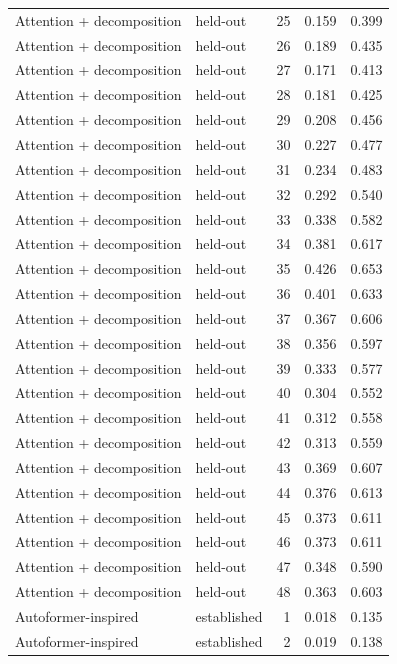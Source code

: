 \begin{tabular}{llrrr}
Attention + decomposition & held-out & 25 & 0.159 & 0.399 \\
Attention + decomposition & held-out & 26 & 0.189 & 0.435 \\
Attention + decomposition & held-out & 27 & 0.171 & 0.413 \\
Attention + decomposition & held-out & 28 & 0.181 & 0.425 \\
Attention + decomposition & held-out & 29 & 0.208 & 0.456 \\
Attention + decomposition & held-out & 30 & 0.227 & 0.477 \\
Attention + decomposition & held-out & 31 & 0.234 & 0.483 \\
Attention + decomposition & held-out & 32 & 0.292 & 0.540 \\
Attention + decomposition & held-out & 33 & 0.338 & 0.582 \\
Attention + decomposition & held-out & 34 & 0.381 & 0.617 \\
Attention + decomposition & held-out & 35 & 0.426 & 0.653 \\
Attention + decomposition & held-out & 36 & 0.401 & 0.633 \\
Attention + decomposition & held-out & 37 & 0.367 & 0.606 \\
Attention + decomposition & held-out & 38 & 0.356 & 0.597 \\
Attention + decomposition & held-out & 39 & 0.333 & 0.577 \\
Attention + decomposition & held-out & 40 & 0.304 & 0.552 \\
Attention + decomposition & held-out & 41 & 0.312 & 0.558 \\
Attention + decomposition & held-out & 42 & 0.313 & 0.559 \\
Attention + decomposition & held-out & 43 & 0.369 & 0.607 \\
Attention + decomposition & held-out & 44 & 0.376 & 0.613 \\
Attention + decomposition & held-out & 45 & 0.373 & 0.611 \\
Attention + decomposition & held-out & 46 & 0.373 & 0.611 \\
Attention + decomposition & held-out & 47 & 0.348 & 0.590 \\
Attention + decomposition & held-out & 48 & 0.363 & 0.603 \\
Autoformer-inspired & established & 1 & 0.018 & 0.135 \\
Autoformer-inspired & established & 2 & 0.019 & 0.138 \\

\end{tabular}

